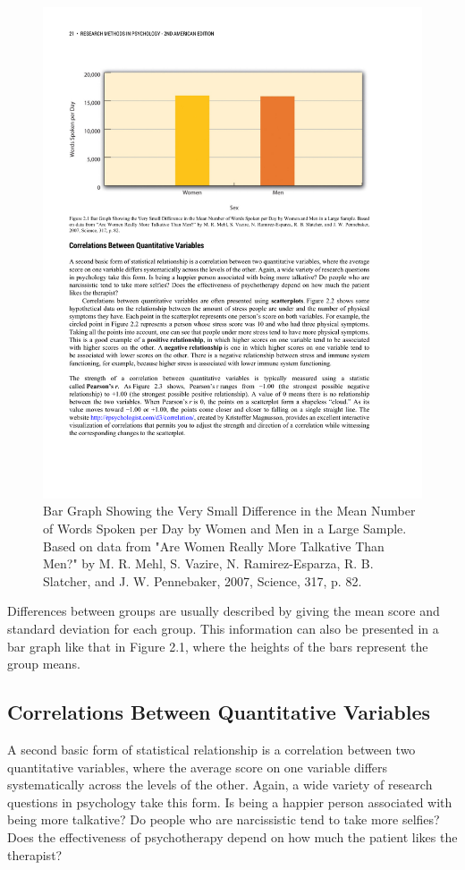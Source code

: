  \begin{figure}
       \includegraphics[width=.75\linewidth]{figures/C2F2_barchart.pdf}
       \caption{Bar Graph Showing the Very Small Difference in the Mean Number of Words Spoken per Day by Women and Men in a Large Sample. Based on data from "Are Women Really More Talkative Than Men?" by M. R. Mehl, S. Vazire, N. Ramirez-Esparza, R. B. Slatcher, and J. W. Pennebaker, 2007, Science, 317, p. 82.}
       \label{fig:Bargraph}
 \end{figure}

 Differences between groups are usually described by giving the mean score and standard deviation for each group. This information can also be presented in a bar graph like that in Figure 2.1, where the heights of the bars represent the group means.

\subsection{Correlations Between Quantitative Variables}
A second basic form of statistical relationship is a correlation between two quantitative variables, where the average score on one variable differs systematically across the levels of the other. Again, a wide variety of research questions in psychology take this form. Is being a happier person associated with being more talkative? Do people who are narcissistic tend to take more selfies? Does the effectiveness of psychotherapy depend on how much the patient likes the therapist?

